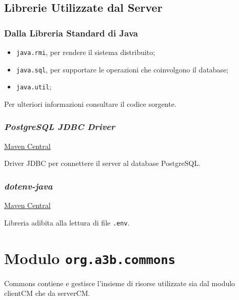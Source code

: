 \section{Librerie Utilizzate dal Server}

\subsection{Dalla Libreria Standard di Java}

\begin{itemize}
	\item \texttt{java.rmi}, per rendere il sistema distribuito;
	\item \texttt{java.sql}, per supportare le operazioni che coinvolgono il database;
	\item \texttt{java.util};
\end{itemize}
Per ulteriori informazioni consultare il codice sorgente.

\subsection{\textsl{PostgreSQL JDBC Driver}}

\href{https://mvnrepository.com/artifact/org.postgresql/postgresql/42.7.3}{Maven Central}

Driver JDBC per connettere il server al database PostgreSQL.

\subsection{\textsl{dotenv-java}}

\href{https://mvnrepository.com/artifact/io.github.cdimascio/dotenv-java/3.0.0}{Maven Central}
	
Libreria adibita alla lettura di file \texttt{.env}.

\chapter{Modulo \texttt{org.a3b.commons}}
\label{ch:commons}
Commons contiene e gestisce l'insieme di risorse utilizzate sia dal modulo clientCM che da serverCM.

